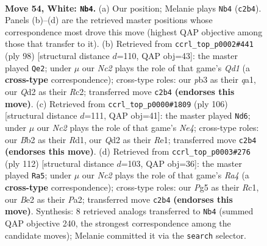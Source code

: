 \documentclass[11pt]{article}
\begin{document}
\clearpage

\begin{figure}[p]\centering
\begin{subfigure}{0.46\textwidth}\centering
\resizebox{\linewidth}{!}{%
\newchessgame
\chessboard[
  setfen={rn1qk2r/4n1b1/6p1/3p2P1/3P1P1p/1p1R3P/1BNQBK2/7R w - - 0 54},
  showmover=false,
  pgfstyle=straightmove, color=movearrow, markmove={c2-b4}
]}
\caption{}
\end{subfigure}\hfill
\begin{subfigure}{0.46\textwidth}\centering
\resizebox{\linewidth}{!}{%
\newchessgame
\chessboard[
  setfen={1r1r4/k4pp1/p3p1b1/4P3/2Pp2P1/1n1P3R/2R2BBK/q2Q4 w - - 18 50},
  showmover=false,
  pgfstyle=straightmove, color=movearrow, markmove={d1-e2}
]}
\caption{}
\end{subfigure}
\\[4pt]
\begin{subfigure}{0.46\textwidth}\centering
\resizebox{\linewidth}{!}{%
\newchessgame
\chessboard[
  setfen={3q3k/1p2r1nr/5p2/1bP2p2/p2PN2P/P7/5Q1B/3RR1K1 w - - 0 54},
  showmover=false,
  pgfstyle=straightmove, color=movearrow, markmove={e4-d6}
]}
\caption{}
\end{subfigure}\hfill
\begin{subfigure}{0.46\textwidth}\centering
\resizebox{\linewidth}{!}{%
\newchessgame
\chessboard[
  setfen={1r2n2k/2rq2p1/4b2p/4Pp1P/R1P2P2/2Q1B3/P3B3/K1R5 w - - 43 57},
  showmover=false,
  pgfstyle=straightmove, color=movearrow, markmove={a4-a5}
]}
\caption{}
\end{subfigure}
\caption{\textbf{Move 54, White: \texttt{Nb4}.} (a) Our position; Melanie plays \texttt{Nb4} (\texttt{c2b4}). Panels (b)--(d) are the retrieved master positions whose correspondence most drove this move (highest QAP objective among those that transfer to it). (b) Retrieved from \texttt{ccrl\_top\_p0002\#441} (ply 98) [structural distance $d$=110, QAP obj=43]: the master played \texttt{Qe2}; under $\mu$ our \emph{Nc2} plays the role of that game's \emph{Qd1} (a \textbf{cross-type} correspondence); cross-type roles: our \emph{p}b3 as their \emph{q}a1, our \emph{Q}d2 as their \emph{R}c2; transferred move \texttt{c2b4} \textbf{(endorses this move)}. (c) Retrieved from \texttt{ccrl\_top\_p0000\#1809} (ply 106) [structural distance $d$=111, QAP obj=41]: the master played \texttt{Nd6}; under $\mu$ our \emph{Nc2} plays the role of that game's \emph{Ne4}; cross-type roles: our \emph{B}b2 as their \emph{R}d1, our \emph{Q}d2 as their \emph{R}e1; transferred move \texttt{c2b4} \textbf{(endorses this move)}. (d) Retrieved from \texttt{ccrl\_top\_p0003\#276} (ply 112) [structural distance $d$=103, QAP obj=36]: the master played \texttt{Ra5}; under $\mu$ our \emph{Nc2} plays the role of that game's \emph{Ra4} (a \textbf{cross-type} correspondence); cross-type roles: our \emph{P}g5 as their \emph{R}c1, our \emph{B}e2 as their \emph{P}a2; transferred move \texttt{c2b4} \textbf{(endorses this move)}. Synthesis: 8 retrieved analogs transferred to \texttt{Nb4} (summed QAP objective 240, the strongest correspondence among the candidate moves); Melanie committed it via the \texttt{search} selector.}
\label{fig:thought-m106}
\end{figure}
\end{document}
